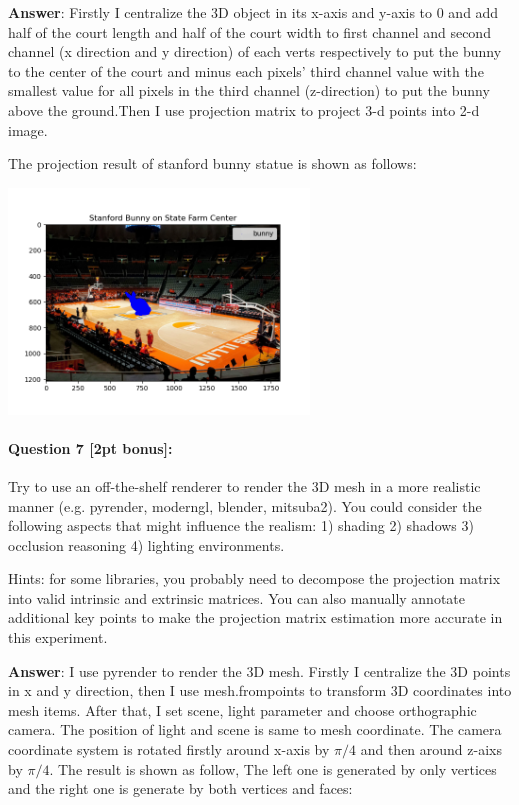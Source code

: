 \documentclass[11pt]{article}
\begin{document}
\textbf{Answer}: Firstly I centralize the 3D object in its x-axis and y-axis to 0 and add half of the court length and half of the court width to first channel and second channel (x direction and y direction) of each verts respectively to put the bunny to the center of the court and minus each pixels' third channel value with the smallest value for all pixels in the third channel (z-direction) to put the bunny above the ground.Then I use projection matrix to project 3-d points into 2-d image.

The projection result of stanford bunny statue is shown as follows:

\begin{center}
    \includegraphics[width=8cm]{fig/stanfordbunnyonstatefarmcenter.png}
\end{center}

\paragraph{Question 7 [2pt bonus]:} Try to use an off-the-shelf renderer to render the 3D mesh in a more realistic manner (e.g. pyrender, moderngl, blender, mitsuba2). You could consider the following aspects that might influence the realism: 1) shading 2) shadows 3) occlusion reasoning 4) lighting environments. 

Hints: for some libraries, you probably need to decompose the projection matrix into valid intrinsic and extrinsic matrices. You can also manually annotate additional key points to make the projection matrix estimation more accurate in this experiment.

\textbf{Answer}: I use pyrender to render the 3D mesh. Firstly I centralize the 3D points in x and y direction, then I use mesh.frompoints to transform 3D coordinates into mesh items. After that, I set scene, light parameter and choose orthographic camera. The position of light and scene is same to mesh coordinate. The camera coordinate system is rotated firstly around x-axis by $\pi/4$ and then around z-aixs by $\pi/4$. The result is shown as follow, The left one is generated by only vertices and the right one is generate by both vertices and faces: 
\end{document}
